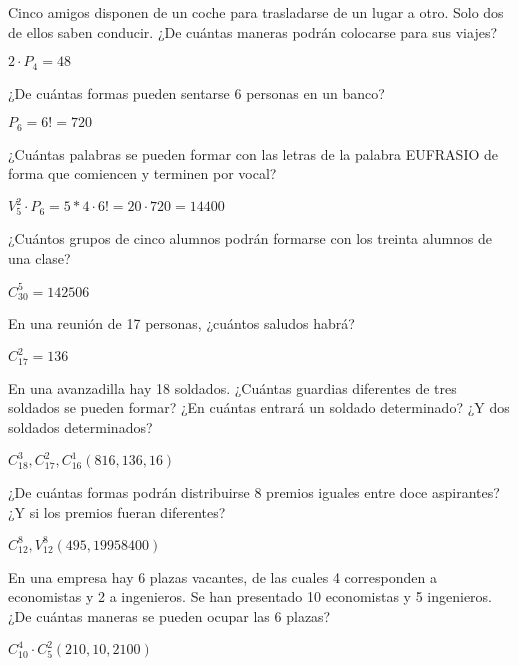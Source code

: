 \documentclass[spanish, 10pt]{exam}
\begin{document}
\begin{questions}
\question Cinco amigos disponen de un coche para trasladarse de un lugar
a otro. Solo dos de ellos saben conducir. ¿De cuántas maneras podrán colocarse para sus viajes?
\begin{solution}
$2\cdot P_4=48$
\end{solution}


\question ¿De cuántas formas pueden sentarse 6 personas en un banco?
\begin{solution}
$P_6= 6!=720$
\end{solution}

\question ¿Cuántas palabras se pueden formar con las letras de la palabra EUFRASIO de forma que comiencen y terminen por vocal?
\begin{solution}
$V_5^2\cdot P_6= 5*4 \cdot 6!=20\cdot720=14400 $
\end{solution}


\question ¿Cuántos grupos de cinco alumnos podrán formarse con los
treinta alumnos de una clase?
\begin{solution}
$C_30^5=142506 $
\end{solution}

\question En una reunión de 17 personas, ¿cuántos saludos habrá?
\begin{solution}
$C_17^2=136 $
\end{solution}

\question En una avanzadilla hay 18 soldados. ¿Cuántas guardias diferentes de tres soldados se pueden formar? ¿En cuántas entrará un
soldado determinado? ¿Y dos soldados determinados?
\begin{solution}
$C_18^3, C_17^2, C_16^1 (816, 136, 16)$
\end{solution}

\question ¿De cuántas formas podrán distribuirse 8 premios iguales entre doce aspirantes? ¿Y si los premios fueran diferentes?
\begin{solution}
$C_12^8, V_12^8 (495, 19958400)$
\end{solution}

\question En una empresa hay 6 plazas vacantes, de las cuales 4 corresponden a economistas y 2 a ingenieros. Se han presentado 10 economistas y 5 ingenieros. ¿De cuántas maneras se pueden ocupar las 6 plazas?
\begin{solution}
$C_10^4 \cdot C_5^2 (210, 10, 2100)$
\end{solution}



\begin{comment}
\question 
\begin{multicols}{3}
\begin{parts}
\part[]  
\begin{solution} \end{solution}
\end{parts}
\end{multicols}
\end{comment}


\end{questions}
\end{document}
